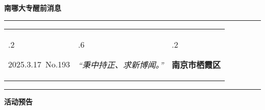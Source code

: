 \documentclass[letterpaper, 12pt]{article}
\begin{document}
\begin{center}
    \Huge\textbf{南哪大专醒前消息}
\end{center}
\vspace{4mm}
\hrule
\renewcommand\tabularxcolumn[1]{m{#1}}
\begin{tabularx}{\textwidth}{>{\hsize.2\hsize}X>{\hsize.6\hsize}X>{\hsize.2\hsize}X}
    \begin{flushleft}
        2025.3.17\, No.193
    \end{flushleft}
    &
    \begin{center}
        \textit{“秉中持正、求新博闻。”}
    \end{center}
    &
    \begin{flushright}
        \textbf{南京市栖霞区}
    \end{flushright}
\end{tabularx}
\vspace{-3.5mm}
\hrule
\vspace{4mm}
\centerline{\huge\textbf{活动预告}}
\end{document}
